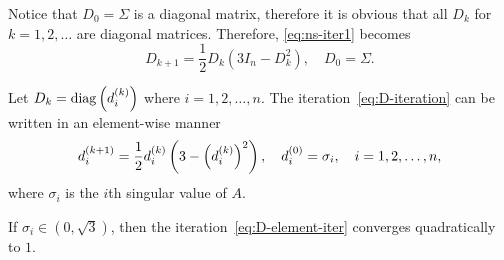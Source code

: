 \documentclass[12pt]{article}
\begin{document}
Notice that $D_0 = \Sigma$ is a diagonal matrix, therefore it is obvious that all $D_k$ for $k = 1,2,\dots$ are diagonal matrices. Therefore, \eqref{eq:ns-iter1} becomes 
\begin{equation}
    \label{eq:D-iteration}
    D_{k+1} = \frac{1}{2}D_k(3I_n - D_k^2),\quad D_0 = \Sigma.
\end{equation}

Let $D_k = \mathrm{diag}\left(d_i^{(k)}\right)$ where $i=1,2,\dots,n$. The iteration~\eqref{eq:D-iteration} can be written in an element-wise manner
\begin{equation}
    \label{eq:D-element-iter}
    d_i^{(k+1)} = \frac{1}{2}d_i^{(k)}\left(3-\left(d_i^{(k)}\right)^2\right),\quad d_i^{(0)} = \sigma_i, \quad i = 1,2,\dots,n,
\end{equation}
where $\sigma_i$ is the $i$th singular value of $A$.

\begin{lemma}\label{lemma:scalarNS}
    If $\sigma_i\in (0,\sqrt{3})$, then the iteration~\eqref{eq:D-element-iter} converges quadratically to $1$.
\end{lemma}
\end{document}

